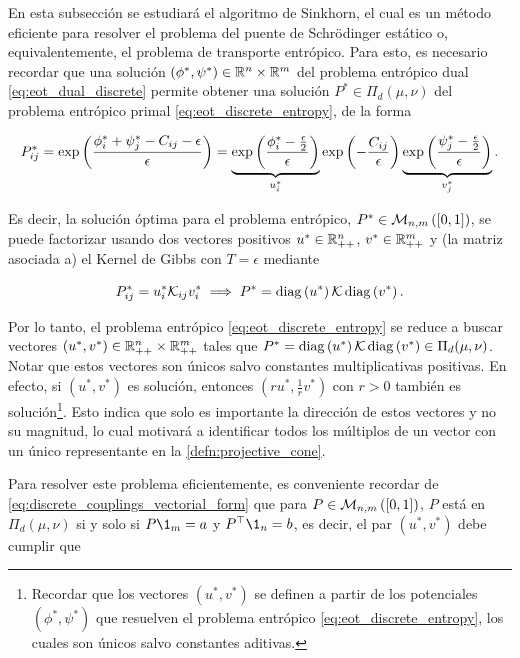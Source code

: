 En esta subsección se estudiará el algoritmo de Sinkhorn, el cual es un método eficiente para resolver el problema del puente de Schrödinger estático o, equivalentemente, el problema de transporte entrópico. Para esto, es necesario recordar que una solución $(\phi^*,\psi^*)\in\mathbb{R}^n\times\mathbb{R}^m$ del problema entrópico dual \eqref{eq:eot_dual_discrete} permite obtener una solución $P^*\in\Pi_d(\mu,\nu)$ del problema entrópico primal \eqref{eq:eot_discrete_entropy}, de la forma

\begin{equation}
	\label{eq:sinkhorn_decomposition}
	P_{ij}^* = \exp\left(\frac{\phi_i^* + \psi_j^* - C_{ij} - \epsilon}{\epsilon}\right)
	= \underbrace{\exp\left(\frac{\phi^*_i-\frac{\epsilon}{2}}{\epsilon}\right)}_{u^*_i}
	\exp\left(-\frac{C_{ij}}{\epsilon}\right)
	\underbrace{\exp\left(\frac{\psi^*_j-\frac{\epsilon}{2}}{\epsilon}\right)}_{v^*_j}.
\end{equation}

Es decir, la solución óptima para el problema entrópico, $P^*\in\mathcal{M}_{n,m}\left([0,1]\right)$, se puede factorizar usando dos vectores positivos $u^*\in\mathbb{R}^n_{++}$, $v^*\in\mathbb{R}^m_{++}$ y (la matriz asociada a) el Kernel de Gibbs con $T=\epsilon$ mediante

\begin{equation*}
	P_{ij}^* = u^*_i \mathcal{K}_{ij} v^*_i \implies P^* = \operatorname{diag}\left(u^*\right)\mathcal{K}\operatorname{diag}\left(v^*\right).
\end{equation*}

Por lo tanto, el problema entrópico \eqref{eq:eot_discrete_entropy} se reduce a buscar vectores $(u^*,v^*)\in\mathbb{R}^n_{++}\times\mathbb{R}^m_{++}$ tales que $P^* = \operatorname{diag}\left(u^*\right)\mathcal{K}\operatorname{diag}\left(v^*\right)\in\Pi_d(\mu,\nu)$. Notar que estos vectores son únicos salvo constantes multiplicativas positivas. En efecto, si $(u^*,v^*)$ es solución, entonces $(ru^*, \frac{1}{r}v^*)$ con $r>0$ también es solución\footnote{Recordar que los vectores $(u^*,v^*)$ se definen a partir de los potenciales $(\phi^*,\psi^*)$ que resuelven el problema entrópico \eqref{eq:eot_discrete_entropy}, los cuales son únicos salvo constantes aditivas.}. Esto indica que solo es importante la dirección de estos vectores y no su magnitud, lo cual motivará a identificar todos los múltiplos de un vector con un único representante en la \autoref{defn:projective_cone}.

Para resolver este problema eficientemente, es conveniente recordar de \eqref{eq:discrete_couplings_vectorial_form} que para $P\in\mathcal{M}_{n,m}\left([0,1]\right)$, $P$ está en $\Pi_d(\mu,\nu)$ si y solo si $P\1_m = a$ y $P^\top \1_n = b$, es decir, el par $(u^*,v^*)$ debe cumplir que

